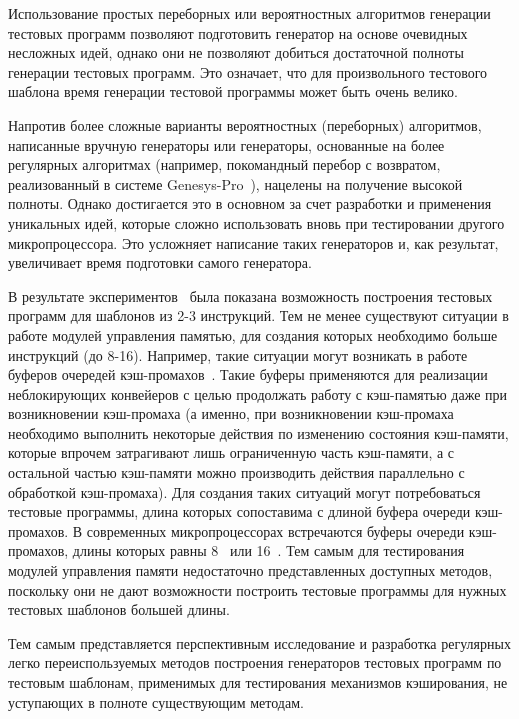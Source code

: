 Использование простых переборных или вероятностных алгоритмов
генерации тестовых программ позволяют подготовить генератор на
основе очевидных несложных идей, однако они не позволяют добиться
достаточной полноты генерации тестовых программ. Это означает, что
для произвольного тестового шаблона время генерации тестовой
программы может быть очень велико.

Напротив более сложные варианты вероятностных (переборных)
алгоритмов, написанные вручную генераторы или генераторы, основанные
на более регулярных алгоритмах (например, покомандный перебор с
возвратом, реализованный в системе Genesys-Pro~\cite{GenesysPro}),
нацелены на получение высокой полноты. Однако достигается это в
основном за счет разработки и применения уникальных идей, которые
сложно использовать вновь при тестировании другого микропроцессора.
Это усложняет написание таких генераторов и, как результат,
увеличивает время подготовки самого генератора.

В результате экспериментов~\cite{vorobyev} была показана возможность
построения тестовых программ для шаблонов из 2-3 инструкций. Тем не
менее существуют ситуации в работе модулей управления памятью, для
создания которых необходимо больше инструкций (до 8-16). Например,
такие ситуации могут возникать в работе буферов очередей
кэш-промахов~\cite{HennesyPatterson}. Такие буферы применяются для
реализации неблокирующих конвейеров с целью продолжать работу с
кэш-памятью даже при возникновении кэш-промаха (а именно, при
возникновении кэш-промаха необходимо выполнить некоторые действия по
изменению состояния кэш-памяти, которые впрочем затрагивают лишь
ограниченную часть кэш-памяти, а с остальной частью кэш-памяти можно
производить действия параллельно с обработкой кэш-промаха). Для
создания таких ситуаций могут потребоваться тестовые программы,
длина которых сопоставима с длиной буфера очереди кэш-промахов. В
современных микропроцессорах встречаются буферы очереди
кэш-промахов, длины которых равны 8~\cite{Alpha21264} или
16~\cite{Alpha21364, Cell}. Тем самым для тестирования модулей
управления памяти недостаточно представленных доступных методов,
поскольку они не дают возможности построить тестовые программы для
нужных тестовых шаблонов большей длины.

Тем самым представляется перспективным исследование и разработка
регулярных легко переиспользуемых методов построения генераторов
тестовых программ по тестовым шаблонам, применимых для тестирования
механизмов кэширования, не уступающих в полноте существующим
методам.

